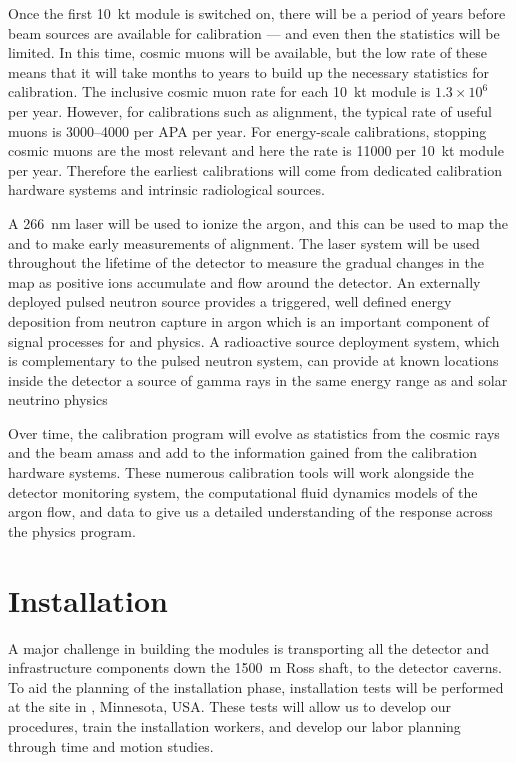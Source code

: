 Once the first \SI{10}{\kilo\tonne} module is switched on, there will be a period of years before  beam sources are available for calibration --- and even then the statistics will be limited. In this time, cosmic muons will be available, but the low rate of these means that it will take months to years to build up the necessary statistics for calibration. The inclusive cosmic muon rate for each \SI{10}{\kilo\tonne} module is $1.3\times 10^{6}$ per year. However, for calibrations such as  alignment, the typical rate of useful muons is 3000--4000 per APA per year. For energy-scale calibrations, stopping cosmic muons are the most relevant and here the rate is 11000 per \SI{10}{\kilo\tonne} module per year. Therefore the earliest calibrations will come from dedicated calibration hardware systems and intrinsic radiological sources.

A \SI{266}{\nano\meter} laser will be used to ionize the argon, and this can be used to map the \efield and to make early measurements of  alignment. The laser system will be used throughout the lifetime of the detector to measure the gradual changes in the \efield map as positive ions accumulate and flow around the detector.
An externally deployed pulsed neutron source provides a triggered, well defined energy deposition from neutron capture in argon which is an important component of signal processes for  and  physics. A radioactive source deployment system, which is complementary to the pulsed neutron system, can provide at known locations inside the detector a source of gamma rays in the same energy range as  and solar neutrino physics

Over time, the  calibration program will evolve as statistics from the cosmic rays and the  beam amass and add to the information gained from the calibration hardware systems. These numerous calibration tools will work alongside the detector monitoring system, the computational fluid dynamics models of the argon flow, and  data to give us a detailed understanding of the  response across the  physics program.


\section{Installation}

A major challenge in building the   modules is transporting all the detector and infrastructure components down the \SI{1500}{\meter} Ross shaft, to the detector caverns. To aid the planning of the installation phase, installation tests will be performed at the   site in , Minnesota, USA. These tests will allow us to develop our procedures, train the installation workers, and develop our labor planning through time and motion studies.

